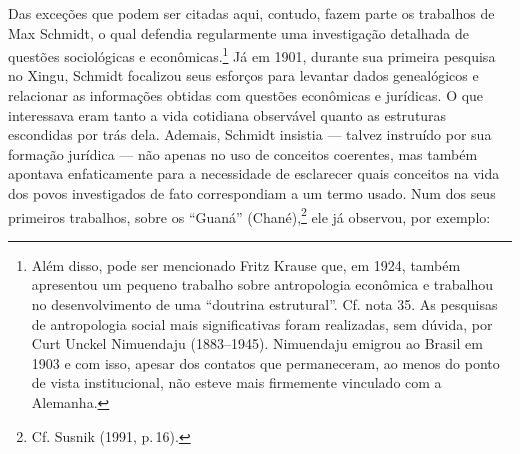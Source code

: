 Das exceções que podem ser citadas aqui, contudo, fazem parte os
trabalhos de Max Schmidt, o qual defendia regularmente uma investigação
detalhada de questões sociológicas e econômicas.\footnote{Além disso,
  pode ser mencionado Fritz Krause que, em 1924, também apresentou um
  pequeno trabalho sobre antropologia econômica e trabalhou no
  desenvolvimento de uma ``doutrina estrutural''. Cf. nota 35. As
  pesquisas de antropologia social mais significativas foram realizadas,
  sem dúvida, por Curt Unckel Nimuendaju (1883--1945). Nimuendaju
  emigrou ao Brasil em 1903 e com isso, apesar dos contatos que
  permaneceram, ao menos do ponto de vista institucional, não esteve
  mais firmemente vinculado com a Alemanha.} Já em 1901, durante sua
primeira pesquisa no Xingu, Schmidt focalizou seus esforços para
levantar dados genealógicos e relacionar as informações obtidas com
questões econômicas e jurídicas. O que interessava eram tanto a vida
cotidiana observável quanto as estruturas escondidas por trás dela.
Ademais, Schmidt insistia --- talvez instruído por sua formação jurídica
--- não apenas no uso de conceitos coerentes, mas também apontava
enfaticamente para a necessidade de esclarecer quais conceitos na vida
dos povos investigados de fato correspondiam a um termo usado. Num dos
seus primeiros trabalhos, sobre os ``Guaná'' (Chané),\footnote{Cf.
  Susnik (1991, p.\,16).} ele já observou, por exemplo:


